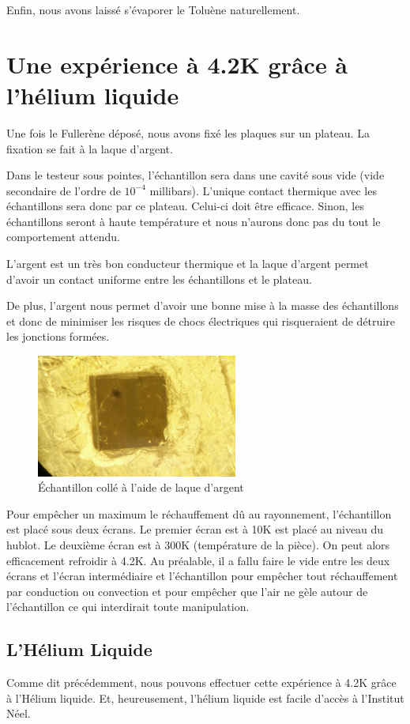Enfin, nous avons laissé s'évaporer le Toluène naturellement.
\section{Une expérience à 4.2K grâce à l'hélium liquide}
Une fois le Fullerène déposé, nous avons fixé les plaques sur un plateau. La fixation se fait à la laque d'argent.

Dans le testeur sous pointes, l'échantillon sera dans une cavité sous vide (vide secondaire de l'ordre de $10^{-4}$ millibars). L'unique contact thermique avec les échantillons sera donc par ce plateau. Celui-ci doit être efficace. Sinon, les échantillons seront à haute température et nous n'aurons donc pas du tout le comportement attendu.

L'argent est un très bon conducteur thermique et la laque d'argent permet d'avoir un contact uniforme entre les échantillons et le plateau.

De plus, l'argent nous permet d'avoir une bonne mise à la masse des échantillons et donc de minimiser les risques de chocs électriques qui risqueraient de détruire les jonctions formées.
\begin{figure}[h]
    \begin{center}
        \includegraphics[width=250px]{Images/PhotoPlaqueTransistors}
        \caption{Échantillon collé à l'aide de laque d'argent}
        \label{fig:}
    \end{center}
\end{figure}

Pour empêcher un maximum le réchauffement dû au rayonnement, l'échantillon est placé sous deux écrans. Le premier écran est à 10K est placé au niveau du hublot. Le deuxième écran est à 300K (température de la pièce). On peut alors efficacement refroidir à 4.2K. Au préalable, il a fallu faire le vide entre les deux écrans et l'écran intermédiaire et l'échantillon pour empêcher tout réchauffement par conduction ou convection et pour empêcher que l'air ne gèle autour de l'échantillon ce qui interdirait toute manipulation.
\subsection{L'Hélium Liquide}
Comme dit précédemment, nous pouvons effectuer cette expérience à 4.2K grâce à l'Hélium liquide. Et, heureusement, l'hélium liquide est facile d'accès à l'Institut Néel.


